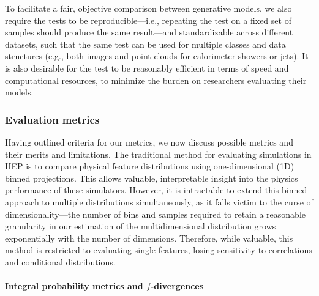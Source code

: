 To facilitate a fair, objective comparison between generative models, we also require the tests to be reproducible---i.e., repeating the test on a fixed set of samples should produce the same result---and standardizable across different datasets, such that the same test can be used for multiple classes and data structures (e.g., both images and point clouds for calorimeter showers or jets).
It is also desirable for the test to be reasonably efficient in terms of speed and computational resources, to minimize the burden on researchers evaluating their models.

\subsubsection{Evaluation metrics}
\label{sec:04_evaluating_emetrics} 

Having outlined criteria for our metrics, we now discuss possible metrics and their merits and limitations.
The traditional method for evaluating simulations in HEP is to compare physical feature distributions using one-dimensional (1D) binned projections. 
This allows valuable, interpretable insight into the physics performance of these simulators.
However, it is intractable to extend this binned approach to multiple distributions simultaneously, as it falls victim to the curse of dimensionality---the number of bins and samples required to retain a reasonable granularity in our estimation of the multidimensional distribution grows exponentially with the number of dimensions.
Therefore, while valuable, this method is restricted to evaluating single features, losing sensitivity to correlations and conditional distributions.

\paragraph{Integral probability metrics and \texorpdfstring{$f$}{f}-divergences}
\label{sec:04_evaluating_ipmsfdivs} 

